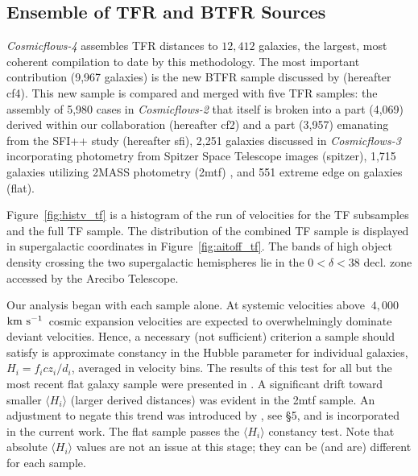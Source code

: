 \documentclass[twocolumn]{aastex63}
\newcommand{\kms}{\mbox{${\rm km~s^{-1}}$}}
\begin{document}
\subsection{Ensemble of TFR and BTFR Sources}

{\it Cosmicflows-4} assembles TFR distances to $12,412$ galaxies, the largest, most coherent compilation to date by this methodology.  The most important contribution (9,967 galaxies) is the new BTFR sample discussed by \citet{2022MNRAS.511.6160K} (hereafter cf4).  This new sample is compared and merged with five TFR samples: the assembly of 5,980 cases in {\it Cosmicflows-2} that itself is broken into a part (4,069) derived within our collaboration (hereafter cf2) and a part (3,957) emanating from the SFI++ study \citep{2007ApJS..172..599S} (hereafter sfi), 2,251 galaxies discussed in {\it Cosmicflows-3} incorporating photometry from Spitzer Space Telescope images (spitzer), 1,715 galaxies utilizing 2MASS photometry (2mtf) \citep{2019MNRAS.487.2061H}, and 551 extreme edge on galaxies \citep{2018MNRAS.479.3373M} (flat). 

Figure~\ref{fig:histv_tf} is a histogram of the run of velocities for the TF subsamples and the full TF sample.
The distribution of the combined TF sample is displayed in supergalactic coordinates in Figure~\ref{fig:aitoff_tf}.  The bands of high object density crossing the two supergalactic hemispheres lie in the $0<\delta<38$ decl. zone accessed by the Arecibo Telescope.      

Our analysis began with each sample alone.  At systemic velocities above $~4,000$~\kms\ cosmic expansion velocities are expected to overwhelmingly dominate deviant velocities.  Hence, a necessary (not sufficient) criterion a sample should satisfy is approximate constancy in the Hubble parameter for individual galaxies, $H_i=f_icz_i/d_i$, averaged in velocity bins.  The results of this test for all but the most recent flat galaxy sample were presented in \citet{2020ApJ...902..145K}.  A significant drift toward smaller $\langle H_i \rangle$ (larger derived distances) was evident in the 2mtf sample.  An adjustment to negate this trend was introduced by \citet{2020ApJ...902..145K}, see \S 5, and is incorporated in the current work.  The flat sample passes the $\langle H_i \rangle$ constancy test.  Note that  absolute $\langle H_i \rangle$ values are not an issue at this stage; they can be (and are) different for each sample. 
\end{document}
